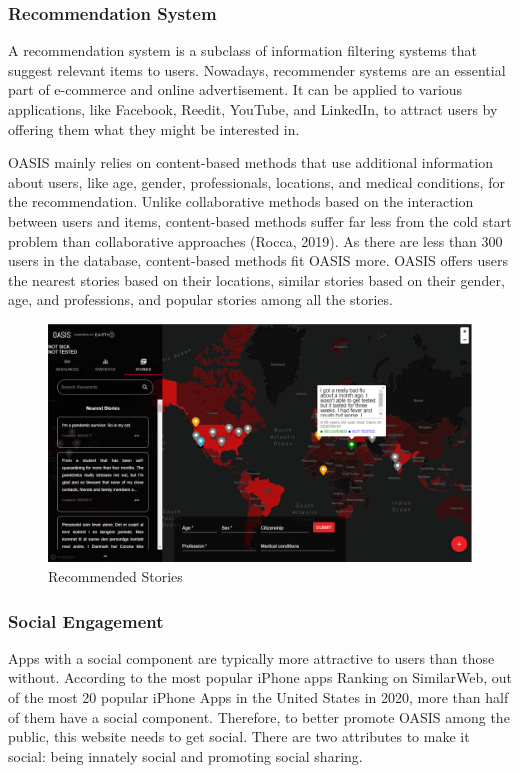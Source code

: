 \documentclass{ucsdreport}
\begin{document}
\subsubsection{Recommendation System}
A recommendation system is a subclass of information filtering systems that 
suggest relevant items to users. Nowadays, recommender systems are an essential
part of e-commerce and online advertisement. It can be applied to various 
applications, like Facebook, Reedit, YouTube, and LinkedIn, to attract users
by offering them what they might be interested in. 

OASIS mainly relies on content-based methods that use additional information
about users, like age, gender, professionals, locations, and medical conditions,
for the recommendation. Unlike collaborative methods based on the interaction 
between users and items, content-based methods suffer far less from the cold 
start problem than collaborative approaches (Rocca, 2019). As there are less
than 300 users in the database, content-based methods fit OASIS more. OASIS 
offers users the nearest stories based on their locations, similar stories
based on their gender, age, and professions, and popular stories among all 
the stories. 

\begin{figure}[H]
    \centering
    \includegraphics[scale=0.4]{images/stories.png}
    \caption{Recommended Stories}
\end{figure}


\subsubsection{Social Engagement}
Apps with a social component are typically more attractive to users than those
without. According to the most popular iPhone apps Ranking on SimilarWeb, 
out of the most 20 popular iPhone Apps in the United States in 2020, 
more than half of them have a social component. Therefore, to better promote 
OASIS among the public, this website needs to get social. There are two 
attributes to make it social: being innately social and promoting social sharing. 
\end{document}
